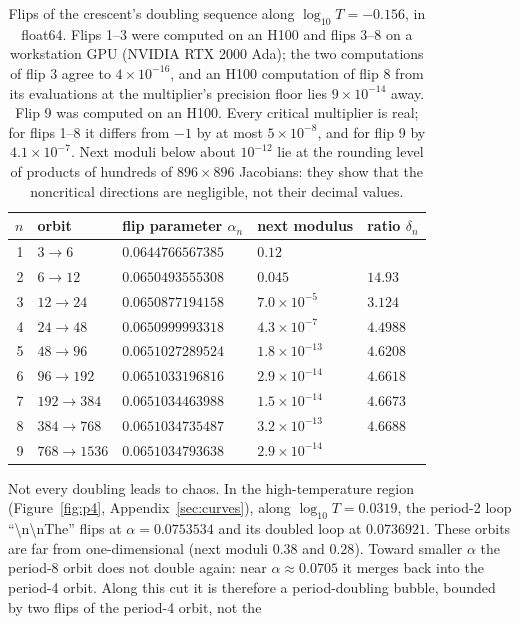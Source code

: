 \documentclass[11pt,letterpaper]{article}
\begin{document}
\begin{table}[H]
\centering\small
\begin{tabular}{rllll}
\toprule
$n$ & orbit & flip parameter $\alpha_n$ & next modulus & ratio $\delta_n$ \\
\midrule
1 & $3\to6$ & $0.0644766567385$ & $0.12$ & \\
2 & $6\to12$ & $0.0650493555308$ & $0.045$ & $14.93$ \\
3 & $12\to24$ & $0.0650877194158$ & $7.0\times10^{-5}$ & $3.124$ \\
4 & $24\to48$ & $0.0650999993318$ & $4.3\times10^{-7}$ & $4.4988$ \\
5 & $48\to96$ & $0.0651027289524$ & $1.8\times10^{-13}$ & $4.6208$ \\
6 & $96\to192$ & $0.0651033196816$ & $2.9\times10^{-14}$ & $4.6618$ \\
7 & $192\to384$ & $0.0651034463988$ & $1.5\times10^{-14}$ & $4.6673$ \\
8 & $384\to768$ & $0.0651034735487$ & $3.2\times10^{-13}$ & $4.6688$ \\
9 & $768\to1536$ & $0.0651034793638$ & $2.9\times10^{-14}$ & \\
\bottomrule
\end{tabular}
\caption{Flips of the crescent's doubling sequence along $\log_{10}T=-0.156$, in float64. Flips 1--3 were computed on
an H100 and flips 3--8 on a workstation GPU (NVIDIA RTX 2000 Ada); the two computations of flip 3 agree to
$4\times10^{-16}$, and an H100 computation of flip 8 from its evaluations at the multiplier's precision floor lies
$9\times10^{-14}$ away. Flip 9 was computed on an H100. Every critical multiplier is real; for flips 1--8 it differs from $-1$ by at most
$5\times10^{-8}$, and for flip 9 by $4.1\times10^{-7}$. Next moduli below about $10^{-12}$ lie at the rounding level of products of
hundreds of $896\times896$ Jacobians: they show that the noncritical directions are negligible, not their decimal
values.}
\label{tab:cascade156}
\end{table}
Not every doubling leads to chaos. In the high-temperature region (Figure~\ref{fig:p4}, Appendix~\ref{sec:curves}), along
$\log_{10}T=0.0319$, the period-2 loop ``\textbackslash n\textbackslash nThe'' flips at $\alpha=0.0753534$ and its
doubled loop at $0.0736921$. These orbits are far from one-dimensional (next moduli $0.38$ and $0.28$). Toward
smaller $\alpha$ the period-8 orbit does not double again: near $\alpha\approx0.0705$ it merges back into the period-4
orbit. Along this cut it is therefore a period-doubling bubble, bounded by two flips of the period-4 orbit, not the
\end{document}

